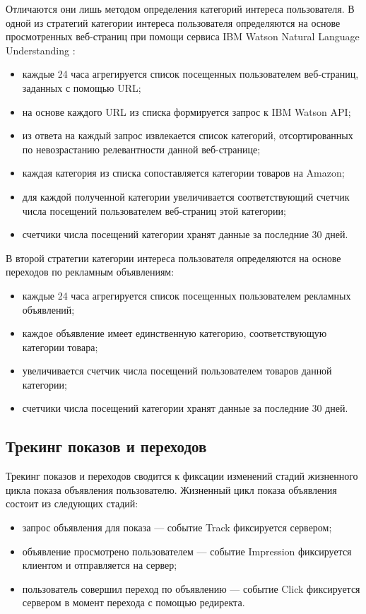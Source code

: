 \documentclass[specification,annotation,times]{itmo-student-thesis}
\begin{document}
Отличаются они лишь методом определения категорий интереса пользователя. В одной из стратегий категории интереса пользователя определяются на основе просмотренных веб-страниц при помощи сервиса IBM Watson Natural Language Understanding \cite{IBM-NLP}:
\begin{itemize}
\item каждые 24 часа агрегируется список посещенных пользователем веб-страниц, заданных с помощью URL;
\item на основе каждого URL из списка формируется запрос к IBM Watson API;
\item из ответа на каждый запрос извлекается список категорий, отсортированных по невозрастанию релевантности данной веб-странице;
\item каждая категория из списка сопоставляется категории товаров на Amazon;
\item для каждой полученной категории увеличивается соответствующий счетчик числа посещений пользователем веб-страниц этой категории;
\item счетчики числа посещений категории хранят данные за последние 30 дней.
\end{itemize}

В второй стратегии категории интереса пользователя определяются на основе переходов по рекламным объявлениям:
\begin{itemize}
\item каждые 24 часа агрегируется список посещенных пользователем рекламных объявлений;
\item каждое объявление имеет единственную категорию, соответствующую категории товара;
\item увеличивается счетчик числа посещений пользователем товаров данной категории;
\item счетчики числа посещений категории хранят данные за последние 30 дней.
\end{itemize}

\subsection{Трекинг показов и переходов}

Трекинг показов и переходов сводится к фиксации изменений стадий жизненного цикла показа объявления пользователю. Жизненный цикл показа объявления состоит из следующих стадий:
\begin{itemize}
\item запрос объявления для показа — событие Track фиксируется сервером;
\item объявление просмотрено пользователем — событие Impression фиксируется клиентом и отправляется на сервер;
\item пользователь совершил переход по объявлению — событие Click фиксируется сервером в момент перехода с помощью редиректа.
\end{itemize}
\end{document}
